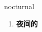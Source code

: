 
\begin{frame}
{\huge nocturnal}
\begin{center}
\begin{enumerate}\Large
  \item \textbf{夜间的}
\end{enumerate}
\end{center}
\end{frame}
